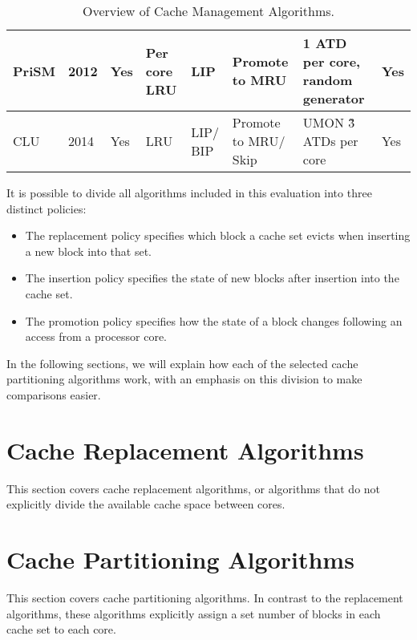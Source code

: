 \begin{table}[thb]
\begin{tabular}{p{1.4cm}p{0.5cm}p{0.8cm}p{1.2cm}p{1.2cm}p{1.4cm}p{1.2cm}p{1.0cm}}
PriSM                           & 2012                           & Yes                         & Per core LRU                  & LIP                           & Promote to MRU                 & 1 ATD per core, random generator                       & Yes  \\ \hline
CLU                             & 2014                           & Yes                         & LRU                              & LIP/ BIP                        & Promote to MRU/ Skip            & UMON \~3 ATDs per core                & Yes  \\ 
\bottomrule
\end{tabular}
\caption{Overview of Cache Management Algorithms.}
\label{tbl:algorithms}
\end{table}
\clearpage

It is possible to divide all algorithms included in this evaluation into three distinct policies:
\begin{itemize}
\item The replacement policy specifies which block a cache set evicts when inserting a new block into that set.
\item The insertion policy specifies the state of new blocks after insertion into the cache set.
\item The promotion policy specifies how the state of a block changes following an access from a processor core.
\end{itemize}
In the following sections, we will explain how each of the selected cache partitioning algorithms work, with an emphasis on this division to make comparisons easier.

\section{Cache Replacement Algorithms}
This section covers cache replacement algorithms, or algorithms that do not explicitly divide the available cache space between cores.









\section{Cache Partitioning Algorithms}
This section covers cache partitioning algorithms.
In contrast to the replacement algorithms, these algorithms explicitly assign a set number of blocks in each cache set to each core.




